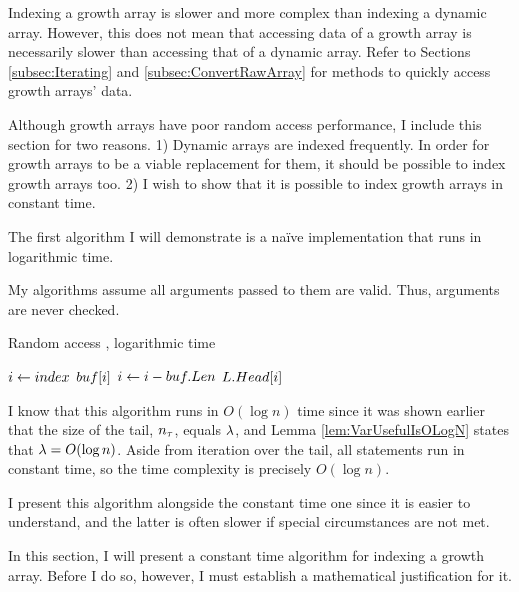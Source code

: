 \HdrGrowthArrayImpl

Indexing a growth array is slower and more complex than indexing a dynamic array. However, this does not mean that accessing data of a growth array is necessarily slower than accessing that of a dynamic array. Refer to Sections \ref{subsec:Iterating} and \ref{subsec:ConvertRawArray} for methods to quickly access growth arrays' data.

Although growth arrays have poor random access performance, I include this section for two reasons. 1) Dynamic arrays are indexed frequently. In order for growth arrays to be a viable replacement for them, it should be possible to index growth arrays too. 2) I wish to show that it is possible to index growth arrays in constant time.

\HdrLogarithmicImpl

The first algorithm I will demonstrate is a na\"{i}ve implementation that runs in logarithmic time.

{\HdrNote} My algorithms assume all arguments passed to them are valid. Thus, arguments are never checked.

\begin{algorithm}[H]
	\caption{Random access \TextGrowthArray, logarithmic time}
	\begin{algorithmic}
		\Function{$\FuncGetItem$}{$\VarList,\ \ParamIndex$}
			\State $i \gets index$
					\State \Return $buf[i]$
				\EndIf
				\State $i \gets i - buf.Len$
			\EndFor
			\State \Return $L.Head[i]$
		\EndFunction
	\end{algorithmic}
\end{algorithm}

I know that this algorithm runs in $O(\log n)$ time since it was shown earlier that the size of the tail, $n_\tau$, equals $\lambda$, and Lemma \ref{lem:VarUsefulIsOLogN} states that $\lambda = O(\log n)$. Aside from iteration over the tail, all statements run in constant time, so the time complexity is precisely $O(\log n)$.

I present this algorithm alongside the constant time one since it is easier to understand, and the latter is often slower if special circumstances are not met.

\HdrConstantImpl

In this section, I will present a constant time algorithm for indexing a growth array. Before I do so, however, I must establish a mathematical justification for it.

